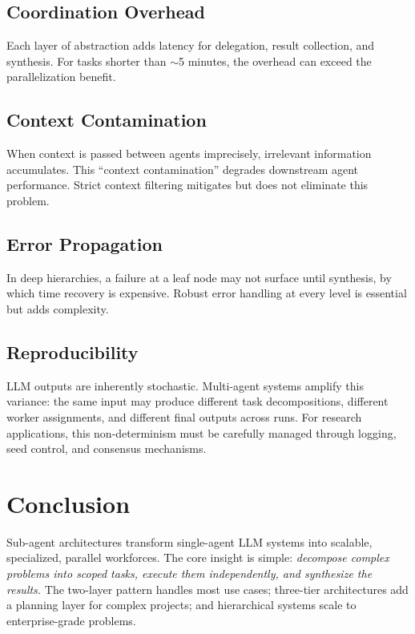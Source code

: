 \documentclass[11pt,letterpaper,twocolumn]{article}
\begin{document}
\subsection{Coordination Overhead}

Each layer of abstraction adds latency for delegation, result collection, and
synthesis.  For tasks shorter than $\sim$5 minutes, the overhead can
exceed the parallelization benefit.

\subsection{Context Contamination}

When context is passed between agents imprecisely, irrelevant information
accumulates.  This ``context contamination'' degrades downstream agent
performance.  Strict context filtering mitigates but does not eliminate
this problem.

\subsection{Error Propagation}

In deep hierarchies, a failure at a leaf node may not surface until synthesis,
by which time recovery is expensive.  Robust error handling at every level is
essential but adds complexity.

\subsection{Reproducibility}

LLM outputs are inherently stochastic.  Multi-agent systems amplify this
variance: the same input may produce different task decompositions, different
worker assignments, and different final outputs across runs.  For research
applications, this non-determinism must be carefully managed through logging,
seed control, and consensus mechanisms.

\section{Conclusion}

Sub-agent architectures transform single-agent LLM systems into scalable,
specialized, parallel workforces.  The core insight is simple:
\emph{decompose complex problems into scoped tasks, execute them
independently, and synthesize the results.}  The two-layer pattern handles
most use cases; three-tier architectures add a planning layer for complex
projects; and hierarchical systems scale to enterprise-grade problems.
\end{document}
